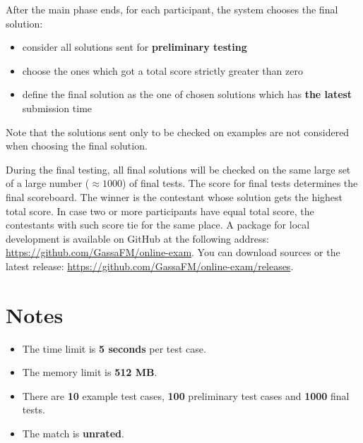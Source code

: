 \documentclass[hyperref,UTF8]{ctexart}
\theoremstyle{definition}
\theoremstyle{remark}
\numberwithin{equation}{subsection}
\newcommand{\Emph}{\textbf}
\begin{document}
	After the main phase ends, for each participant, the system chooses the final solution:
	\begin{itemize}
		
		\item consider all solutions sent for \Emph{preliminary testing}
		
		\item choose the ones which got a total score strictly greater than zero
		
		\item define the final solution as the one of chosen solutions which has \Emph{the latest} submission time
		
	\end{itemize}
	
	Note that the solutions sent only to be checked on examples are not considered when choosing the final solution.
	
	During the final testing, all final solutions will be checked on the same large set of a large
	number ($\approx 1000$) of final tests. The score for final tests determines the final scoreboard.
	The winner is the contestant whose solution gets the highest total score.
	In case two or more participants have equal total score, the contestants with such score tie for the same place.
	A package for local development is available on GitHub at the following address:
	\href{https://github.com/GassaFM/online-exam}{https://github.com/GassaFM/online-exam}.
	You can download sources or the latest release: \href{https://github.com/GassaFM/online-exam/releases}{https://github.com/GassaFM/online-exam/releases}.
	
\section{Notes}	

	\begin{itemize}
	
		\item The time limit is \Emph{5 seconds} per test case.
		
		\item The memory limit is \Emph{512 MB}.
		
		\item There are \Emph{10} example test cases, \Emph{100} preliminary test cases and \Emph{1000} final tests.

		\item The match is \Emph{unrated}.
		
	\end{itemize}
\end{document}
